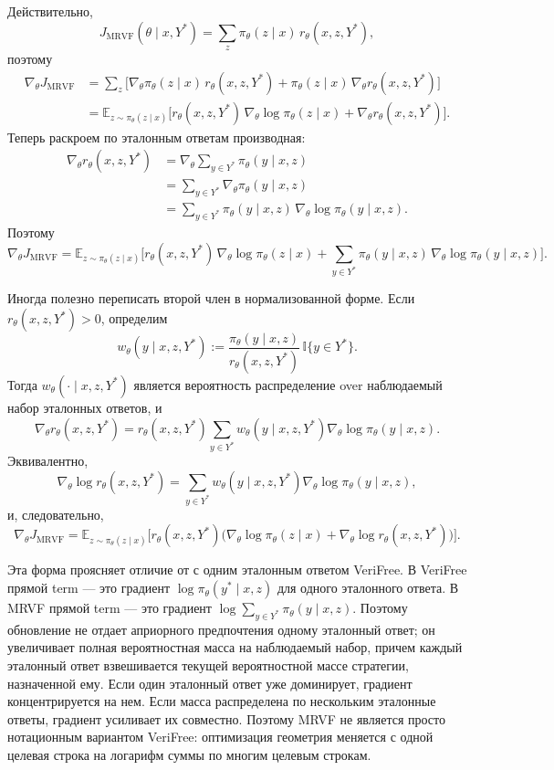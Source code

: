 Действительно,
\[
 J_{\mathrm{MRVF}}(\theta\mid x,Y^{*})
 =
 \sum_{z}\pi_{\theta}(z\mid x)\,r_{\theta}(x,z,Y^{*}),
\]
поэтому
\begin{align*}
 \nabla_{\theta}J_{\mathrm{MRVF}}
 & =
 \sum_{z}
 \Big[
 \nabla_{\theta}\pi_{\theta}(z\mid x)\,r_{\theta}(x,z,Y^{*})
 +
 \pi_{\theta}(z\mid x)\,\nabla_{\theta}r_{\theta}(x,z,Y^{*})
 \Big] \\
 & =
 \mathbb{E}_{z\sim\pi_{\theta}(z\mid x)}
 \Big[
 r_{\theta}(x,z,Y^{*})\,\nabla_{\theta}\log\pi_{\theta}(z\mid x)
 +
 \nabla_{\theta}r_{\theta}(x,z,Y^{*})
 \Big].
\end{align*}
Теперь раскроем по эталонным ответам производная:
\begin{align*}
 \nabla_{\theta}r_{\theta}(x,z,Y^{*})
 & =
 \nabla_{\theta}
 \sum_{y\in Y^{*}}\pi_{\theta}(y\mid x,z) \\
 & =
 \sum_{y\in Y^{*}}
 \nabla_{\theta}\pi_{\theta}(y\mid x,z) \\
 & =
 \sum_{y\in Y^{*}}
 \pi_{\theta}(y\mid x,z)\,\nabla_{\theta}\log\pi_{\theta}(y\mid x,z).
\end{align*}
Поэтому
\[
 \nabla_{\theta}J_{\mathrm{MRVF}}
 =
 \mathbb{E}_{z\sim\pi_{\theta}(z\mid x)}
 \Bigg[
 r_{\theta}(x,z,Y^{*})\,\nabla_{\theta}\log\pi_{\theta}(z\mid x)
 +
 \sum_{y\in Y^{*}}
 \pi_{\theta}(y\mid x,z)\,\nabla_{\theta}\log\pi_{\theta}(y\mid x,z)
 \Bigg].
\]

Иногда полезно переписать второй член в нормализованной форме. Если \(r_{\theta}(x,z,Y^{*})>0\), определим
\[
 w_{\theta}(y\mid x,z,Y^{*})
 :=
 \frac{\pi_{\theta}(y\mid x,z)}{r_{\theta}(x,z,Y^{*})}
 \,\mathbb{I}\{y\in Y^{*}\}.
\]
Тогда \(w_{\theta}(\cdot\mid x,z,Y^{*})\) является вероятность распределение over наблюдаемый набор эталонных ответов, и
\[
 \nabla_{\theta}r_{\theta}(x,z,Y^{*})
 =
 r_{\theta}(x,z,Y^{*})
 \sum_{y\in Y^{*}}
 w_{\theta}(y\mid x,z,Y^{*})
 \nabla_{\theta}\log\pi_{\theta}(y\mid x,z).
\]
Эквивалентно,
\[
 \nabla_{\theta}\log r_{\theta}(x,z,Y^{*})
 =
 \sum_{y\in Y^{*}}
 w_{\theta}(y\mid x,z,Y^{*})
 \nabla_{\theta}\log\pi_{\theta}(y\mid x,z),
\]
и, следовательно,
\[
 \nabla_{\theta}J_{\mathrm{MRVF}}
 =
 \mathbb{E}_{z\sim\pi_{\theta}(z\mid x)}
 \Big[
 r_{\theta}(x,z,Y^{*})
 \big(
 \nabla_{\theta}\log\pi_{\theta}(z\mid x)
 +
 \nabla_{\theta}\log r_{\theta}(x,z,Y^{*})
 \big)
 \Big].
\]

Эта форма проясняет отличие от с одним эталонным ответом VeriFree. В VeriFree прямой term --- это градиент \(\log\pi_{\theta}(y^{*}\mid x,z)\) для одного эталонного ответа. В MRVF прямой term --- это градиент \(\log \sum_{y\in Y^{*}}\pi_{\theta}(y\mid x,z)\). Поэтому обновление не отдает априорного предпочтения одному эталонный ответ; он увеличивает полная вероятностная масса на наблюдаемый набор, причем каждый эталонный ответ взвешивается текущей вероятностной массе стратегии, назначенной ему. Если один эталонный ответ уже доминирует, градиент концентрируется на нем. Если масса распределена по нескольким эталонные ответы, градиент усиливает их совместно. Поэтому MRVF не является просто нотационным вариантом VeriFree: оптимизация геометрия меняется с одной целевая строка на логарифм суммы по многим целевым строкам.

